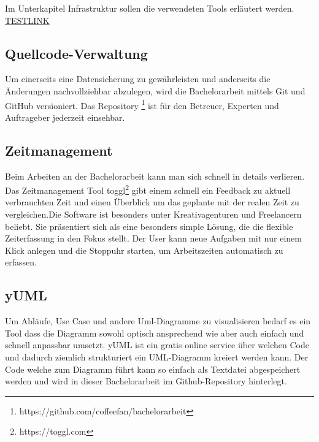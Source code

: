 Im Unterkapitel Infrastruktur sollen die verwendeten Tools erläutert
werden. \protect\hyperlink{open-design}{TESTLINK}

\subsection{Quellcode-Verwaltung}\label{quellcode-verwaltung}

Um einerseits eine Datensicherung zu gewährleisten und anderseits die
Änderungen nachvollziehbar abzulegen, wird die Bachelorarbeit mittels
Git und GitHub versioniert. Das Repository \footnote{https://github.com/coffeefan/bachelorarbeit}
ist für den Betreuer, Experten und Auftrageber jederzeit einsehbar.

\subsection{Zeitmanagement}\label{zeitmanagement}

Beim Arbeiten an der Bachelorarbeit kann man sich schnell in details
verlieren. Das Zeitmanagement Tool toggl\footnote{https://toggl.com}
gibt einem schnell ein Feedback zu aktuell verbrauchten Zeit und einen
Überblick um das geplante mit der realen Zeit zu vergleichen.Die
Software ist besonders unter Kreativagenturen und Freelancern beliebt.
Sie präsentiert sich als eine besonders simple Lösung, die die flexible
Zeiterfassung in den Fokus stellt. Der User kann neue Aufgaben mit nur
einem Klick anlegen und die Stoppuhr starten, um Arbeitszeiten
automatisch zu erfassen.

\newpage

\subsection{yUML}\label{yuml}

Um Abläufe, Use Case und andere Uml-Diagramme zu visualisieren bedarf es
ein Tool dass die Diagramm sowohl optisch ansprechend wie aber auch
einfach und schnell anpassbar umsetzt. yUML ist ein gratis online
service über welchen Code und dadurch ziemlich strukturiert ein
UML-Diagramm kreiert werden kann. Der Code welche zum Diagramm führt
kann so einfach als Textdatei abgespeichert werden und wird in dieser
Bachelorarbeit im Github-Repository hinterlegt.

